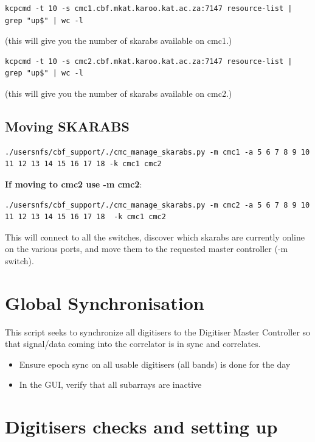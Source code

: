 \begin{lstlisting}[style=DOS]
kcpcmd -t 10 -s cmc1.cbf.mkat.karoo.kat.ac.za:7147 resource-list | grep "up$" | wc -l
\end{lstlisting}
(this will give you the number of skarabs available on cmc1.) 
\begin{lstlisting}[style=DOS]
kcpcmd -t 10 -s cmc2.cbf.mkat.karoo.kat.ac.za:7147 resource-list | grep "up$" | wc -l
\end{lstlisting}
(this will give you the number of skarabs available on cmc2.) \\

\subsection{Moving SKARABS}
\begin{lstlisting}[style=DOS]
./usersnfs/cbf_support/./cmc_manage_skarabs.py -m cmc1 -a 5 6 7 8 9 10 11 12 13 14 15 16 17 18 -k cmc1 cmc2
\end{lstlisting}
\textbf{If moving to cmc2 use -m cmc2}:
\begin{lstlisting}[style=DOS]
./usersnfs/cbf_support/./cmc_manage_skarabs.py -m cmc2 -a 5 6 7 8 9 10 11 12 13 14 15 16 17 18  -k cmc1 cmc2
\end{lstlisting}




This will connect to all the switches, discover which skarabs are currently online on the various ports, and move them to the requested master controller (-m switch).



\section{Global Synchronisation}

This script seeks to synchronize all digitisers to the Digitiser Master Controller so that signal/data coming into the correlator is in sync and correlates. 
\begin{itemize}
\item{} Ensure epoch sync on all usable digitisers (all bands) is done for the day
\item{} In the GUI, verify that all subarrays are inactive
\end{itemize}

\section{Digitisers checks and setting up }

